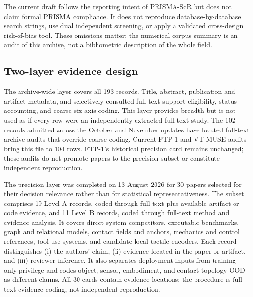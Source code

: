 The current draft follows the reporting intent of PRISMA-ScR but does not claim
formal PRISMA compliance. It does not reproduce database-by-database search
strings, use dual independent screening, or apply a validated cross-design
risk-of-bias tool. These omissions matter: the numerical corpus summary is an
audit of this archive, not a bibliometric description of the whole field.

\subsection{Two-layer evidence design}

The archive-wide layer covers all 193 records. Title, abstract, publication and
artifact metadata, and selectively consulted full text support eligibility,
status accounting, and coarse six-axis coding. This layer provides breadth but
is not used as if every row were an independently extracted full-text study.
The 102 records admitted across the October and November updates have located
full-text archive audits that override coarse coding. Current FTP-1 and VT-MUSE
audits bring this file to 104 rows. FTP-1's historical precision card remains
unchanged; these audits do not promote papers to the precision subset or
constitute independent reproduction.

The precision layer was completed on 13 August 2026 for 30 papers selected for
their decision relevance rather than for statistical representativeness. The
subset comprises 19 Level A records, coded through full text plus available
artifact or code evidence, and 11 Level B records, coded through full-text method
and evidence analysis. It covers direct system competitors, executable
benchmarks, graph and relational models, contact fields and anchors, mechanics
and control references, tool-use systems, and candidate local tactile encoders.
Each record distinguishes (i) the authors' claim, (ii) evidence located in the
paper or artifact, and (iii) reviewer inference. It also separates deployment
inputs from training-only privilege and codes object, sensor, embodiment, and
contact-topology OOD as different claims. All 30 cards contain evidence locations;
the procedure is full-text evidence coding, not independent reproduction.


